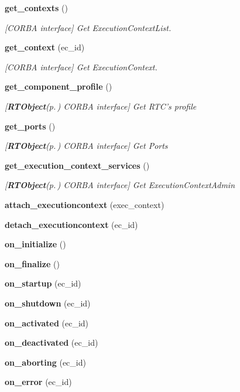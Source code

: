 \begin{CompactItemize}
{\bf get\_\-contexts} ()
\begin{CompactList}\small\item\em [CORBA interface] Get Execution\-Context\-List. \item\end{CompactList}\item 
{\bf get\_\-context} (ec\_\-id)
\begin{CompactList}\small\item\em [CORBA interface] Get Execution\-Context. \item\end{CompactList}\item 
{\bf get\_\-component\_\-profile} ()
\begin{CompactList}\small\item\em [{\bf RTObject}{\rm (p.\,\pageref{namespaceRTObject})} CORBA interface] Get RTC's profile \item\end{CompactList}\item 
{\bf get\_\-ports} ()
\begin{CompactList}\small\item\em [{\bf RTObject}{\rm (p.\,\pageref{namespaceRTObject})} CORBA interface] Get Ports \item\end{CompactList}\item 
{\bf get\_\-execution\_\-context\_\-services} ()
\begin{CompactList}\small\item\em [{\bf RTObject}{\rm (p.\,\pageref{namespaceRTObject})} CORBA interface] Get Execution\-Context\-Admin \item\end{CompactList}\item 
{\bf attach\_\-executioncontext} (exec\_\-context)
\item 
{\bf detach\_\-executioncontext} (ec\_\-id)
\item 
{\bf on\_\-initialize} ()
\item 
{\bf on\_\-finalize} ()
\item 
{\bf on\_\-startup} (ec\_\-id)
\item 
{\bf on\_\-shutdown} (ec\_\-id)
\item 
{\bf on\_\-activated} (ec\_\-id)
\item 
{\bf on\_\-deactivated} (ec\_\-id)
\item 
{\bf on\_\-aborting} (ec\_\-id)
\item 
{\bf on\_\-error} (ec\_\-id)

\end{CompactItemize}
